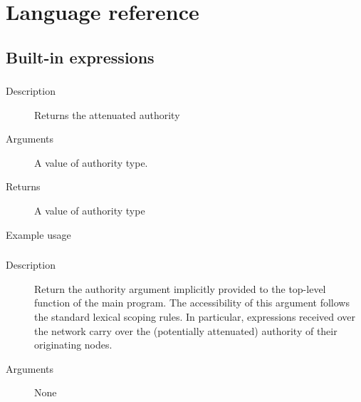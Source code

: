 \section{Language reference}

\subsection{Built-in expressions}

\subsubsection{}
\begin{description}
    \item [Description] Returns the attenuated authority 
    \item [Arguments] A value of authority type.
    \item [Returns] A value of authority type
    \item [Example usage] 
\end{description}


\subsubsection{}

\begin{description}
    \item [Description] Return the authority argument implicitly provided to the top-level function of the main program.
The accessibility of this argument follows the standard lexical scoping rules. In particular, expressions received over the network carry over the (potentially attenuated) authority of their originating nodes.
    \item [Arguments] None
\end{description}

